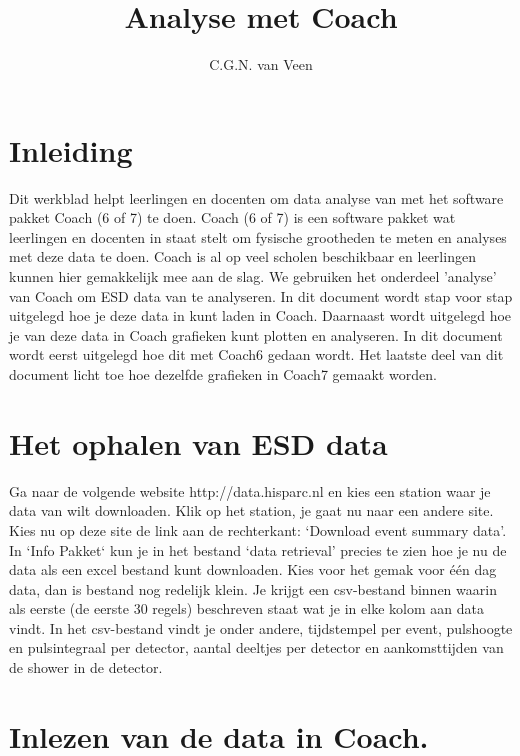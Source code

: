 

\title{Analyse met Coach}
\author{C.G.N. van Veen}



\maketitle

\section{Inleiding}

Dit werkblad helpt leerlingen en docenten om data analyse van \hisparc met 
het software pakket Coach (6 of 7) te doen. Coach (6 of 7) is een software pakket wat leerlingen
en docenten in staat stelt om fysische grootheden te meten en analyses met deze 
data te doen. Coach is al op veel scholen beschikbaar en leerlingen kunnen hier
gemakkelijk mee aan de slag.
We gebruiken het onderdeel 'analyse' van Coach om ESD data van \hisparc te analyseren.
In dit document wordt stap voor stap uitgelegd hoe je deze data in kunt laden in 
Coach. Daarnaast wordt uitgelegd hoe je van deze data in Coach
grafieken kunt plotten en analyseren. In dit document wordt eerst uitgelegd hoe
dit met Coach6 gedaan wordt. Het laatste deel van dit document licht toe hoe dezelfde grafieken
in Coach7 gemaakt worden.

\section{Het ophalen van ESD data}

Ga naar de volgende website http://data.hisparc.nl en kies een station waar 
je data van wilt downloaden. Klik op het station, je gaat nu naar een andere site.
Kies nu op deze site de link aan de rechterkant: `Download event summary data'.
In `Info Pakket` kun je in het bestand `data retrieval' precies te zien hoe je 
nu de data als een excel bestand kunt downloaden.
Kies voor het gemak voor één dag data, dan is bestand nog redelijk klein.
Je krijgt een csv-bestand binnen waarin als eerste (de eerste 30 regels) beschreven staat wat je 
in elke kolom aan data vindt. In het csv-bestand vindt je onder andere, tijdstempel per event,
pulshoogte en pulsintegraal per detector, aantal deeltjes per detector en aankomsttijden van
de shower in de detector.

\section{Inlezen van de data in Coach.}

